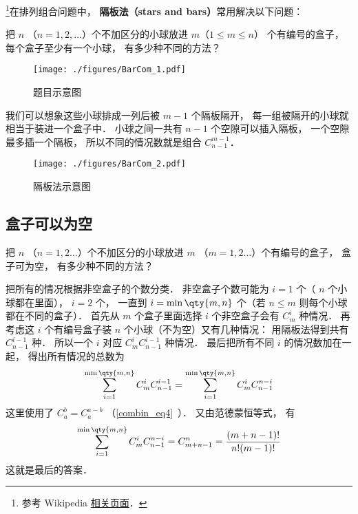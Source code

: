 

\footnote{参考 Wikipedia \href{https://en.wikipedia.org/wiki/Stars_and_bars_(combinatorics)}{相关页面}．}在排列组合问题中， \textbf{隔板法（stars and bars）}常用解决以下问题：

\begin{example}{}
把 $n$ （$n = 1,2,\dots$）个不加区分的小球放进 $m$（$1\leqslant m\leqslant n$） 个有编号的盒子， 每个盒子至少有一个小球， 有多少种不同的方法？
\begin{figure}[ht]
\centering
\texttt{[image: ./figures/BarCom\_1.pdf]}
\caption{题目示意图} \label{BarCom_fig1}
\end{figure}
\end{example}

我们可以想象这些小球排成一列后被 $m-1$ 个隔板隔开， 每一组被隔开的小球就相当于装进一个盒子中． 小球之间一共有 $n-1$ 个空隙可以插入隔板， 一个空隙最多插一个隔板， 所以不同的情况数就是组合 $C_{n-1}^{m-1}$．
\begin{figure}[ht]
\centering
\texttt{[image: ./figures/BarCom\_2.pdf]}
\caption{隔板法示意图} \label{BarCom_fig2}
\end{figure}
\subsection{盒子可以为空}


\begin{example}{}
把 $n$ （$n=1,2\dots$）个不加区分的小球放进 $m$ （$m=1,2\dots$）个有编号的盒子， 盒子可为空， 有多少种不同的方法？
\end{example}

把所有的情况根据非空盒子的个数分类． 非空盒子个数可能为 $i=1$ 个（ $n$ 个小球都在里面）， $i=2$ 个， 一直到 $i=\min\qty{m,n}$ 个（若 $n\leqslant m$ 则每个小球都在不同的盒子）． 首先从 $m$ 个盒子里面选择 $i$ 个非空盒子会有 $C_m^i$ 种情况． 再考虑这 $i$ 个有编号盒子装 $n$ 个小球（不为空）又有几种情况： 用隔板法得到共有 $C_{n-1}^{i-1}$ 种． 所以一个 $i$ 对应 $C_m^i C_{n-1}^{i-1}$ 种情况． 最后把所有不同 $i$ 的情况数加在一起， 得出所有情况的总数为
\begin{equation}
\sum_{i = 1}^{\min\qty{m,n}} C_m^i C_{n-1}^{i-1} = \sum_{i=1}^{\min\qty{m,n}}  C_m^i C_{n-1}^{n-i}
\end{equation}
这里使用了 $C_a^b = C_a^{a-b}$ （\autoref{combin_eq4}~）． 又由范德蒙恒等式， 有
\begin{equation}
\sum_{i=1}^{\min\qty{m,n}}  C_m^i C_{n-1}^{n-i} = C_{m+n-1}^n = \frac{(m+n-1)!}{n!(m - 1)!}
\end{equation}
这就是最后的答案．
